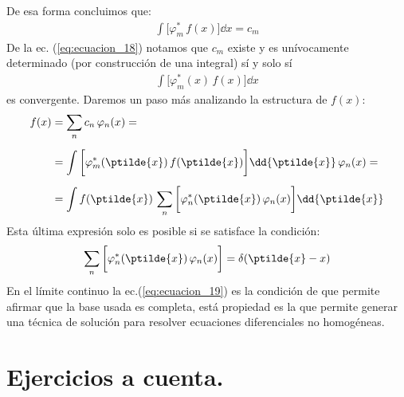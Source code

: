 De esa forma concluimos que:
\begin{align}
\int \bigg[ \varphi_{m}^{*} \, f(x) \bigg] \dd{x} = c_{m}
\label{eq:ecuacion_18}
\end{align}
De la ec. (\ref{eq:ecuacion_18}) notamos que $c_{m}$ existe y es unívocamente determinado (por construcción de una integral) sí y solo sí
\begin{align*}
\int \bigg[ \varphi_{m}^{*}(x) \, f(x) \bigg] \dd{x} 
\end{align*}
es convergente. Daremos un paso más analizando la estructura de $f(x)$:
\begin{align}
\begin{aligned}
f(x) &= \sum_{n} c_{n} \, \varphi_{n}(x) = \\[0.5em]
&= \int \bigg[ \varphi_{m}^{*}(\ptilde{x}) \, f(\ptilde{x}) \bigg] \dd{\ptilde{x}} \, \varphi_{n} (x) = \\[0.5em]
&= \int f(\ptilde{x}) \, \sum_{n} \bigg[ \varphi_{n}^{*}(\ptilde{x}) \, \varphi_{n}(x) \bigg] \dd{\ptilde{x}}
\end{aligned}
\label{eq:ecuacion_19}
\end{align}
Esta última expresión solo es posible si se satisface la condición:
\begin{align}
\sum_{n} \bigg[ \varphi_{n}^{*}(\ptilde{x}) \, \varphi_{n}(x) \bigg] = \delta(\ptilde{x} - x)
\label{eq:ecuacion_20}
\end{align}
En el límite continuo la ec.(\ref{eq:ecuacion_19}) es la condición de que permite afirmar que la base usada es completa, está propiedad es la que permite generar una técnica de solución para resolver ecuaciones diferenciales no homogéneas.

\section{Ejercicios a cuenta.}


